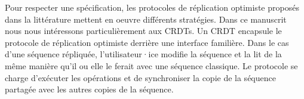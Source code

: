 
Pour respecter une spécification, les protocoles de réplication optimiste proposés dans la littérature mettent en oeuvre différents stratégies.
Dans ce manuscrit nous nous intéressons particulièrement aux \acp{CRDT}.
Un \ac{CRDT} encapsule le protocole de réplication optimiste derrière une interface familière.
Dans le cas d'une séquence répliquée, l'utilisateur·ice modifie la séquence et la lit de la même manière qu'il ou elle le ferait avec une séquence classique.
Le protocole se charge d'exécuter les opérations et de synchroniser la copie de la séquence partagée avec les autres copies de la séquence.

